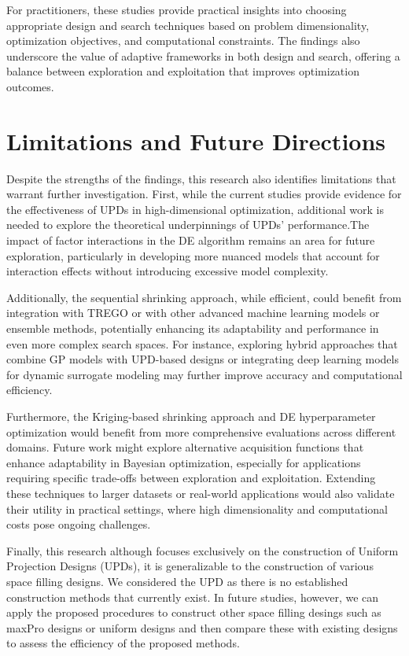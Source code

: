 For practitioners, these studies provide practical insights into choosing appropriate design and search techniques based on problem dimensionality, optimization objectives, and computational constraints. The findings also underscore the value of adaptive frameworks in both design and search, offering a balance between exploration and exploitation that improves optimization outcomes.

\section{Limitations and Future Directions}

Despite the strengths of the findings, this research also identifies limitations that warrant further investigation. First, while the current studies provide evidence for the effectiveness of UPDs in high-dimensional optimization, additional work is needed to explore the theoretical underpinnings of UPDs' performance.The impact of factor interactions in the DE algorithm remains an area for future exploration, particularly in developing more nuanced models that account for interaction effects without introducing excessive model complexity.

Additionally, the sequential shrinking approach, while efficient, could benefit from integration with TREGO or with other advanced machine learning models or ensemble methods, potentially enhancing its adaptability and performance in even more complex search spaces. For instance, exploring hybrid approaches that combine GP models with UPD-based designs or integrating deep learning models for dynamic surrogate modeling may further improve accuracy and computational efficiency.

Furthermore, the Kriging-based shrinking approach and DE hyperparameter optimization would benefit from more comprehensive evaluations across different domains. Future work might explore alternative acquisition functions that enhance adaptability in Bayesian optimization, especially for applications requiring specific trade-offs between exploration and exploitation. Extending these techniques to larger datasets or real-world applications would also validate their utility in practical settings, where high dimensionality and computational costs pose ongoing challenges.

Finally, this research although focuses exclusively on the construction of Uniform Projection Designs (UPDs), it is generalizable to the construction of various space filling designs.  We considered the UPD as there is no established construction methods that currently exist. In future studies, however, we can apply the proposed procedures to construct other space filling desings such as maxPro designs or uniform designs and then compare these with existing designs to assess the efficiency of the proposed methods.

